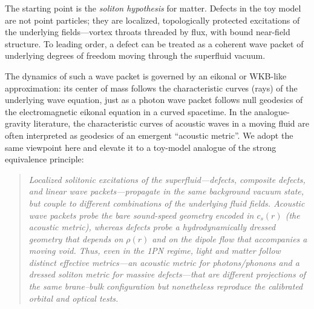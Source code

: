 \documentclass[11pt]{article}
\begin{document}
The starting point is the \emph{soliton hypothesis} for matter.
Defects in the toy model are not point particles; they are localized,
topologically protected excitations of the underlying fields---vortex
throats threaded by flux, with bound near-field structure.
To leading order, a defect can be treated as a coherent wave packet of
underlying degrees of freedom moving through the superfluid vacuum.

The dynamics of such a wave packet is governed by an eikonal or
WKB-like approximation: its center of mass follows the characteristic
curves (rays) of the underlying wave equation, just as a photon wave packet
follows null geodesics of the electromagnetic eikonal equation in a curved
spacetime.
In the analogue-gravity literature, the characteristic curves of acoustic
waves in a moving fluid are often interpreted as geodesics of an emergent
``acoustic metric''.
We adopt the same viewpoint here and elevate it to a toy-model analogue of
the strong equivalence principle:

\begin{quote}
  \emph{Localized solitonic excitations of the superfluid---defects,
  composite defects, and linear wave packets---propagate in the same
  background vacuum state, but couple to different combinations of the
  underlying fluid fields.
  Acoustic wave packets probe the bare sound-speed geometry encoded in
  $c_s(r)$ (the acoustic metric), whereas defects probe a hydrodynamically
  dressed geometry that depends on $\rho(r)$ and on the dipole flow that
  accompanies a moving void.
  Thus, even in the 1PN regime, light and matter follow \emph{distinct}
  effective metrics---an acoustic metric for photons/phonons and a dressed
  soliton metric for massive defects---that are different projections of the
  same brane--bulk configuration but nonetheless reproduce the calibrated
  orbital and optical tests.}
\end{quote}
\end{document}
